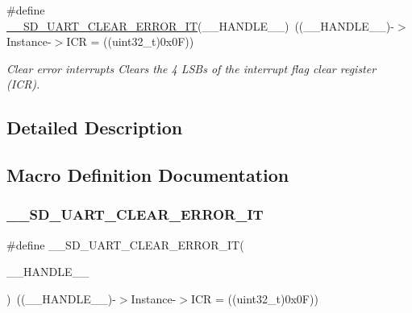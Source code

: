 \begin{DoxyCompactItemize}
\#define \mbox{\hyperlink{group___s_d___u_a_r_t___defines_ga2f7c7d01afb8822a032abc57a3bf78cf}{\+\_\+\+\_\+\+S\+D\+\_\+\+U\+A\+R\+T\+\_\+\+C\+L\+E\+A\+R\+\_\+\+E\+R\+R\+O\+R\+\_\+\+IT}}(\+\_\+\+\_\+\+H\+A\+N\+D\+L\+E\+\_\+\+\_\+)~((\+\_\+\+\_\+\+H\+A\+N\+D\+L\+E\+\_\+\+\_\+)-\/$>$Instance-\/$>$I\+CR = ((uint32\+\_\+t)0x0\+F))
\begin{DoxyCompactList}\small\item\em Clear error interrupts Clears the 4 L\+S\+Bs of the interrupt flag clear register (I\+CR). \end{DoxyCompactList}\end{DoxyCompactItemize}


\subsection{Detailed Description}


\subsection{Macro Definition Documentation}
\mbox{\label{group___s_d___u_a_r_t___defines_ga2f7c7d01afb8822a032abc57a3bf78cf}} 
\subsubsection{\texorpdfstring{\+\_\+\+\_\+\+S\+D\+\_\+\+U\+A\+R\+T\+\_\+\+C\+L\+E\+A\+R\+\_\+\+E\+R\+R\+O\+R\+\_\+\+IT}{\_\_SD\_UART\_CLEAR\_ERROR\_IT}}
{\footnotesize\ttfamily \#define \+\_\+\+\_\+\+S\+D\+\_\+\+U\+A\+R\+T\+\_\+\+C\+L\+E\+A\+R\+\_\+\+E\+R\+R\+O\+R\+\_\+\+IT(\begin{DoxyParamCaption}\item[{}]{\+\_\+\+\_\+\+H\+A\+N\+D\+L\+E\+\_\+\+\_\+ }\end{DoxyParamCaption})~((\+\_\+\+\_\+\+H\+A\+N\+D\+L\+E\+\_\+\+\_\+)-\/$>$Instance-\/$>$I\+CR = ((uint32\+\_\+t)0x0\+F))}



